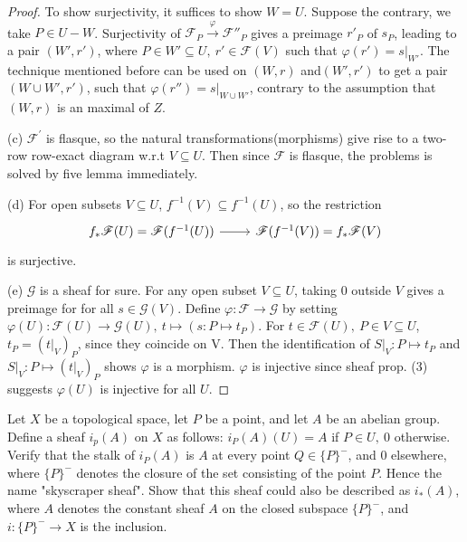 \begin{proof}
	To show surjectivity, it suffices to show $W=U$. Suppose the contrary, we take $P\in U-W$. Surjectivity of $\mathscr{F}_P\xrightarrow{\varphi} \mathscr{F}''_P$ gives a preimage $r'_P$ of $s_P$, leading to a pair $(W',r')$, where $P\in W'\subseteq U,\ r'\in \mathscr{F}(V)$ such that $\varphi(r')=s|_{W'}$. The technique mentioned before can be used on $(W,r)$ and$(W',r')$ to get a pair $(W\cup W',r')$, such that $\varphi(r'')=s|_{W\cup W'}$, contrary to the assumption that $(W,r)$ is an maximal of $Z$.
	
	(c) $\mathscr{F}^{'}$ is flasque, so the natural transformations(morphisms) give rise to a two-row row-exact diagram w.r.t $V\subseteq U$. Then since $\mathscr{F}$ is flasque, the problems is solved by five lemma immediately.
	
	(d) For open subsets $V\subseteq U$, $f^{-1}(V)\subseteq f^{-1}(U)$, so the restriction
	\begin{equation*}
		\begin{tikzcd}
			f_{*}\mathscr{F}(U)=\mathscr{F}(f^{-1}(U)) \arrow[r] & \mathscr{F}(f^{-1}(V))=f_*\mathscr{F}(V)
		\end{tikzcd}
	\end{equation*}
	is surjective.
	
	(e) $\mathscr{G}$ is a sheaf for sure. For any open subset $V\subseteq U$, taking $0$ outside $V$ gives a preimage for for all $s \in \mathscr{G}(V)$. Define $\varphi: \mathscr{F}\rightarrow \mathscr{G}$ by setting $\varphi(U): \mathscr{F}(U)\rightarrow \mathscr{G}(U),\ t\mapsto (s: P \mapsto t_P)$. For $t\in \mathscr{F}(U),\ P\in V\subseteq U$, $t_P=(t|_V)_P$, since they coincide on V. Then the identification of $S|_V: P\mapsto t_P$ and $S|_V: P\mapsto (t|_V)_P$ shows $\varphi$ is a morphism. $\varphi$ is injective since sheaf prop. (3) suggests $\varphi(U)$ is injective for all $U$.
\end{proof}

\begin{exe}
	\label{2.1.17}
	Let $X$ be a topological space, let $P$ be a point, and let $A$ be an abelian group. Define a sheaf $i_p(A)$ on $X$ as follows: $i_P(A)(U)=A$ if $P\in U,\ 0$ otherwise. Verify that the stalk of $i_P(A)$ is $A$ at every point $Q\in \{P\}^-$, and $0$ elsewhere, where $\{P\}^-$ denotes the closure of the set consisting of the point $P$. Hence the name "skyscraper sheaf". Show that this sheaf could also be described as $i_*(A)$, where $A$ denotes the constant sheaf $A$ on the closed subspace $\{P\}^-$, and $i:\{P\}^-\rightarrow X$ is the inclusion.
	
\end{exe}

